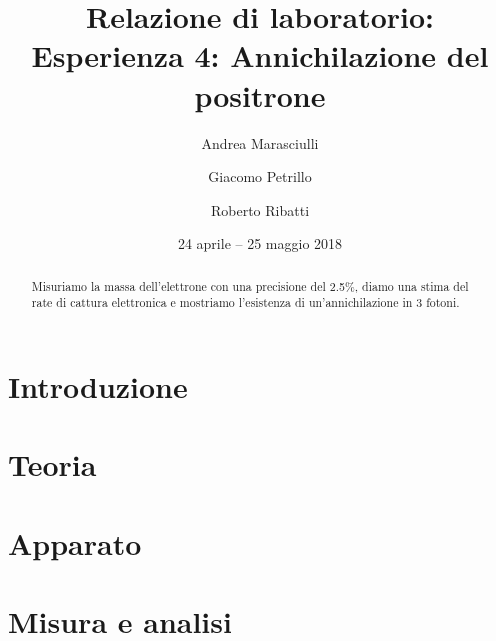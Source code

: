 \documentclass[a4paper]{article}
\title{Relazione di laboratorio:\\
Esperienza 4: Annichilazione del positrone}
\author{Andrea Marasciulli
\and Giacomo Petrillo
\and Roberto Ribatti}
\date{24 aprile -- 25 maggio 2018}
\begin{document}
\maketitle

\begin{abstract}

Misuriamo la massa dell'elettrone con una precisione del 2.5\%, diamo una stima del rate di cattura elettronica e mostriamo l'esistenza di un'annichilazione in 3 fotoni.

\end{abstract}

{\tableofcontents}

\newpage
\section{Introduzione}




\section{Teoria}



\section{Apparato}





\section{Misura e analisi}





















\end{document}
